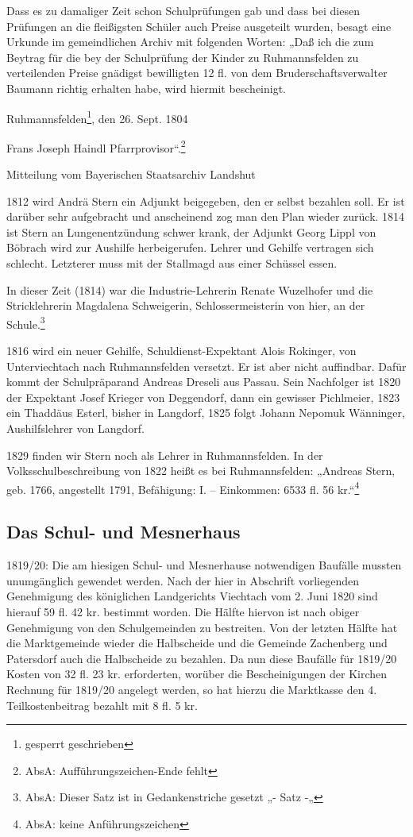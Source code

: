 \documentclass[12pt,a4paper]{book}
\begin{document}
Dass es zu damaliger Zeit schon Schulprüfungen gab und dass bei diesen Prüfungen
an die fleißigsten Schüler auch Preise ausgeteilt wurden, besagt eine Urkunde im
gemeindlichen Archiv mit folgenden Worten: „Daß ich die zum Beytrag für die bey
der Schulprüfung der Kinder zu Ruhmannsfelden zu verteilenden Preise gnädigst
bewilligten 12 fl. von dem Bruderschaftsverwalter Baumann richtig erhalten habe,
wird hiermit bescheinigt.

Ruhmannsfelden\footnote{gesperrt geschrieben}, den 26. Sept. 1804

Frans Joseph Haindl Pfarrprovisor“.\footnote{AbsA: Aufführungszeichen-Ende
fehlt}

Mitteilung vom Bayerischen Staatsarchiv Landshut

1812 wird Andrä Stern ein Adjunkt beigegeben, den er selbst bezahlen soll. Er
ist darüber sehr aufgebracht und anscheinend zog man den Plan wieder zurück.
1814 ist Stern an Lungenentzündung schwer krank, der Adjunkt Georg Lippl von
Böbrach wird zur Aushilfe herbeigerufen. Lehrer und Gehilfe vertragen sich
schlecht. Letzterer muss mit der Stallmagd aus einer Schüssel essen.

In dieser Zeit (1814) war die Industrie-Lehrerin Renate Wuzelhofer und die
Stricklehrerin Magdalena Schweigerin, Schlossermeisterin von hier, an der
Schule.\footnote{AbsA: Dieser Satz ist in Gedankenstriche gesetzt „- Satz -„}

1816 wird ein neuer Gehilfe, Schuldienst-Expektant Alois Rokinger, von
Unterviechtach nach Ruhmannsfelden versetzt. Er ist aber nicht auffindbar. Dafür
kommt der Schulpräparand Andreas Dreseli aus Passau. Sein Nachfolger ist 1820
der Expektant Josef Krieger von Deggendorf, dann ein gewisser Pichlmeier, 1823
ein Thaddäus Esterl, bisher in Langdorf, 1825 folgt Johann Nepomuk Wänninger,
Aushilfslehrer von Langdorf.

1829 finden wir Stern noch als Lehrer in Ruhmannsfelden. In der
Volksschulbeschreibung von 1822 heißt es bei Ruhmannsfelden: „Andreas Stern,
geb. 1766, angestellt 1791, Befähigung: I. – Einkommen: 6533 fl. 56
kr.“\footnote{AbsA: keine Anführungszeichen}

\subsection[Das Schul- und Mesnerhaus]{Das Schul- und
Mesnerhaus\protect\footnotemark{}\protect{}}

1819/20: Die am hiesigen Schul- und Mesnerhause notwendigen Baufälle mussten
unumgänglich gewendet werden. Nach der hier in Abschrift vorliegenden
Genehmigung des königlichen Landgerichts Viechtach vom 2. Juni 1820 sind hierauf
59 fl. 42 kr. bestimmt worden. Die Hälfte hiervon ist nach obiger Genehmigung
von den Schulgemeinden zu bestreiten. Von der letzten Hälfte hat die
Marktgemeinde wieder die Halbscheide und die Gemeinde Zachenberg und Patersdorf
auch die Halbscheide zu bezahlen. Da nun diese Baufälle für 1819/20 Kosten von
32 fl. 23 kr. erforderten, worüber die Bescheinigungen der Kirchen Rechnung für
1819/20 angelegt werden, so hat hierzu die Marktkasse den 4. Teilkostenbeitrag
bezahlt mit 8 fl. 5 kr.
\end{document}
